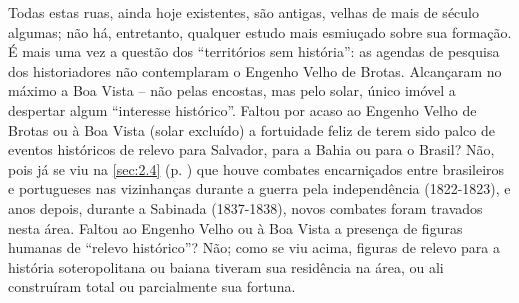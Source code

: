 Todas estas ruas, ainda hoje existentes, são antigas, velhas de mais de século algumas; não há, entretanto, qualquer estudo mais esmiuçado sobre sua formação. É mais uma vez a questão dos ``territórios sem história'': as agendas de pesquisa dos historiadores não contemplaram o Engenho Velho de Brotas. Alcançaram no máximo a Boa Vista -- não pelas encostas, mas pelo solar, único imóvel a despertar algum ``interesse histórico''. Faltou por acaso ao Engenho Velho de Brotas ou à Boa Vista (solar excluído) a fortuidade feliz de terem sido palco de eventos históricos de relevo para Salvador, para a Bahia ou para o Brasil? Não, pois já se viu na \autoref{sec:2.4} (p. \pageref{sec:2.4}) que houve combates encarniçados entre brasileiros e portugueses nas vizinhanças durante a guerra pela independência (1822-1823), e anos depois, durante a Sabinada (1837-1838), novos combates foram travados nesta área. Faltou ao Engenho Velho ou à Boa Vista a presença de figuras humanas de ``relevo histórico''? Não; como se viu acima, figuras de relevo para a história soteropolitana ou baiana tiveram sua residência na área, ou ali construíram total ou parcialmente sua fortuna.

